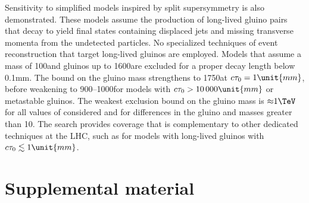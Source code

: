 Sensitivity to simplified models inspired by split supersymmetry is
also demonstrated. These models assume the production of long-lived
gluino pairs that decay to yield final states containing displaced
jets and missing transverse momenta from the undetected \PSGczDo
particles. No specialized techniques of event reconstruction that
target long-lived gluinos are employed. Models that assume a \PSGczDo
mass of 100\GeV and gluinos up to 1600\GeV are excluded for a proper
decay length \ctau below 0.1\unit{mm}. The bound on the gluino mass
strengthens to 1750\GeV at $\ctau = 1\unit{mm}$, before weakening to
900--1000\GeV for models with $\ctau > 10\,000\unit{mm}$ or metastable
gluinos. The weakest exclusion bound on the gluino mass is
${\approx}1\TeV$ for all values of \ctau considered and for
differences in the gluino and \PSGczDo masses greater than 10\GeV. The
search provides coverage that is complementary to other dedicated
techniques at the LHC, such as for models with long-lived gluinos with
$\ctau \lesssim 1\unit{mm}$.


\clearpage



\clearpage
\appendix
\section{Supplemental material\label{app:suppMat}}


